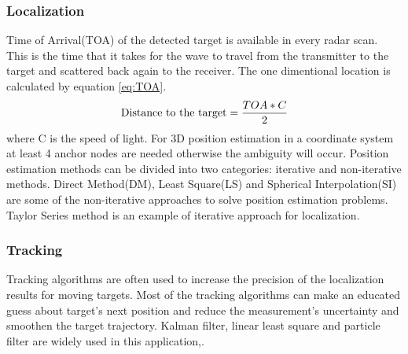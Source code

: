 \subsubsection{Localization}
Time of Arrival(TOA) of the detected target is available in every radar scan. This is the time that it takes for the wave to travel from the transmitter to the target and scattered back again to the receiver. The one dimentional location is calculated by equation \ref{eq:TOA}. 
\begin{equation}
\label{eq:TOA}
	\textnormal{Distance to the target} = \frac{TOA * C}{2}
\end{equation}
where C is the speed of light.
For 3D position estimation in a coordinate system at least 4 anchor nodes are needed otherwise the ambiguity will occur. Position estimation methods can be divided into two categories: iterative and non-iterative methods\cite{UWBLocalization}. Direct Method(DM)\cite{LocalizationDM}, Least Square(LS)\cite{leastSquaresLocalization} and Spherical Interpolation(SI)\cite{SphericalInterpolation} are some of the non-iterative approaches to solve position estimation problems. Taylor Series method is an example of iterative approach for localization\cite{LocalizationTaylorSeries}.

\subsubsection{Tracking}
Tracking algorithms are often used to increase the precision of the localization results for moving targets. Most of the tracking algorithms can make an educated guess about target's next position and reduce the measurement's uncertainty and smoothen the target trajectory. Kalman filter, linear least square and particle filter are widely used in this application\cite{KalmanTracking},\cite{ParticleFilter}.


